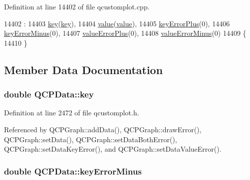 Definition at line 14402 of file qcustomplot.\+cpp.


\begin{DoxyCode}
14402                                          :
14403   \hyperlink{class_q_c_p_data_a2f5ba9aca61bb74f88516e148a4cf71b}{key}(\hyperlink{class_q_c_p_data_a2f5ba9aca61bb74f88516e148a4cf71b}{key}),
14404   \hyperlink{class_q_c_p_data_aefe1ecf8fa2e34ed875b67523e542373}{value}(\hyperlink{class_q_c_p_data_aefe1ecf8fa2e34ed875b67523e542373}{value}),
14405   \hyperlink{class_q_c_p_data_ae468c3808107c2fd23052481156ab5b5}{keyErrorPlus}(0),
14406   \hyperlink{class_q_c_p_data_af107d650b8ee5c3b2961ecddcfb1bccb}{keyErrorMinus}(0),
14407   \hyperlink{class_q_c_p_data_ad26912552d03485ea20d91dcad16aa8f}{valueErrorPlus}(0),
14408   \hyperlink{class_q_c_p_data_a51d8f42bf4d49a1f263531e70cadd6a3}{valueErrorMinus}(0)
14409 \{
14410 \}
\end{DoxyCode}


\subsection{Member Data Documentation}
\hypertarget{class_q_c_p_data_a2f5ba9aca61bb74f88516e148a4cf71b}{}
\subsubsection[{key}]{\setlength{\rightskip}{0pt plus 5cm}double Q\+C\+P\+Data\+::key}\label{class_q_c_p_data_a2f5ba9aca61bb74f88516e148a4cf71b}


Definition at line 2472 of file qcustomplot.\+h.



Referenced by Q\+C\+P\+Graph\+::add\+Data(), Q\+C\+P\+Graph\+::draw\+Error(), Q\+C\+P\+Graph\+::set\+Data(), Q\+C\+P\+Graph\+::set\+Data\+Both\+Error(), Q\+C\+P\+Graph\+::set\+Data\+Key\+Error(), and Q\+C\+P\+Graph\+::set\+Data\+Value\+Error().

\hypertarget{class_q_c_p_data_af107d650b8ee5c3b2961ecddcfb1bccb}{}
\subsubsection[{key\+Error\+Minus}]{\setlength{\rightskip}{0pt plus 5cm}double Q\+C\+P\+Data\+::key\+Error\+Minus}\label{class_q_c_p_data_af107d650b8ee5c3b2961ecddcfb1bccb}


